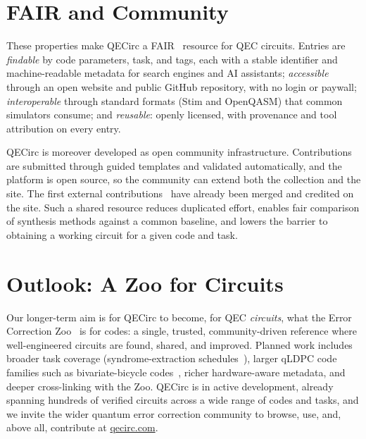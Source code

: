 \documentclass[conference]{IEEEtran}
\begin{document}
\section{FAIR and Community}
These properties make QECirc a FAIR~\cite{WDA+:16} resource for QEC circuits. Entries are \emph{findable} by code parameters, task, and tags, each with a stable identifier and machine-readable metadata for search engines and AI assistants; \emph{accessible} through an open website and public GitHub repository, with no login or paywall; \emph{interoperable} through standard formats (Stim and OpenQASM) that common simulators consume; and \emph{reusable}: openly licensed, with provenance and tool attribution on every entry.

QECirc is moreover developed as open community infrastructure. Contributions are submitted through guided templates and validated automatically, and the platform is open source, so the community can extend both the collection and the site. The first external contributions~\cite{CZO+:26} have already been merged and credited on the site. Such a shared resource reduces duplicated effort, enables fair comparison of synthesis methods against a common baseline, and lowers the barrier to obtaining a working circuit for a given code and task.

\section{Outlook: A Zoo for Circuits}
Our longer-term aim is for QECirc to become, for QEC \emph{circuits}, what the Error Correction Zoo~\cite{AF:22} is for codes: a single, trusted, community-driven reference where well-engineered circuits are found, shared, and improved. Planned work includes broader task coverage (syndrome-extraction schedules~\cite{LPZ+:26}), larger qLDPC code families such as bivariate-bicycle codes~\cite{BCG+:24}, richer hardware-aware metadata, and deeper cross-linking with the Zoo. QECirc is in active development, already spanning hundreds of verified circuits across a wide range of codes and tasks, and we invite the wider quantum error correction community to browse, use, and, above all, contribute at \href{https://qecirc.com}{qecirc.com}.
\end{document}
